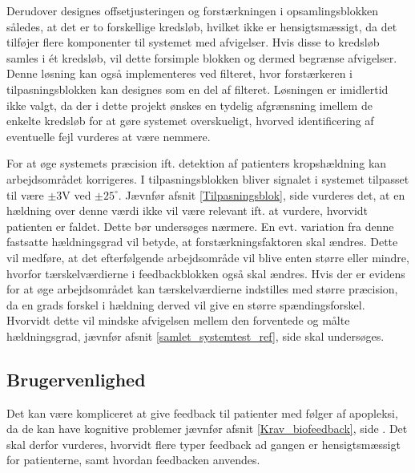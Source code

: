 Derudover designes offsetjusteringen og forstærkningen i opsamlingsblokken således, at det er to forskellige kredsløb, hvilket ikke er hensigtsmæssigt, da det tilføjer flere komponenter til systemet med afvigelser. Hvis disse to kredsløb samles i ét kredsløb, vil dette forsimple blokken og dermed begrænse afvigelser. Denne løsning kan også implementeres ved filteret, hvor forstærkeren i tilpasningsblokken kan designes som en del af filteret. Løsningen er imidlertid ikke valgt, da der i dette projekt ønskes en tydelig afgrænsning imellem de enkelte kredsløb for at gøre systemet overskueligt, hvorved identificering af eventuelle fejl vurderes at være nemmere.

For at øge systemets præcision ift. detektion af patienters kropshældning kan arbejdsområdet korrigeres. I tilpasningsblokken bliver signalet i systemet tilpasset til være $\pm3$V ved $\pm25^{\circ}$. Jævnfør afsnit \ref{Tilpasningsblok}, side \pageref{Tilpasningsblok} vurderes det, at en hældning over denne værdi ikke vil være relevant ift. at vurdere, hvorvidt patienten er faldet. Dette bør undersøges nærmere. En evt. variation fra denne fastsatte hældningsgrad vil betyde, at forstærkningsfaktoren skal ændres. Dette vil medføre, at det efterfølgende arbejdsområde vil blive enten større eller mindre, hvorfor tærskelværdierne i feedbackblokken også skal ændres. Hvis der er evidens for at øge arbejdsområdet kan tærskelværdierne indstilles med større præcision, da en grads forskel i hældning derved vil give en større spændingsforskel. Hvorvidt dette vil mindske afvigelsen mellem den forventede og målte hældningsgrad, jævnfør afsnit \ref{samlet_systemtest_ref}, side \pageref{samlet_systemtest_ref} skal undersøges. 

\subsection{Brugervenlighed}
Det kan være kompliceret at give feedback til patienter med følger af apopleksi, da de kan have kognitive problemer jævnfør afsnit \ref{Krav_biofeedback}, side \pageref{Krav_biofeedback}. Det skal derfor vurderes, hvorvidt flere typer feedback ad gangen er hensigtsmæssigt for patienterne, samt hvordan feedbacken anvendes.  

